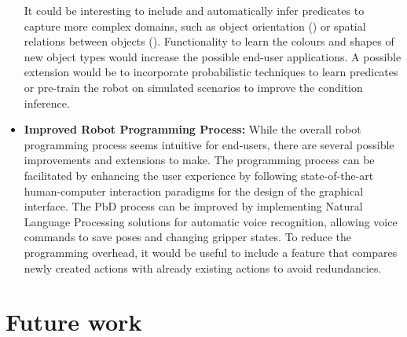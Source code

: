 \begin{itemize}
{	It could be interesting to include and automatically infer predicates to capture more complex domains, such as object orientation (\cite{li2016learning}) or spatial relations between objects (\cite{tremblay2018synthetically}).
	Functionality to learn the colours and shapes of new object types would increase the possible end-user applications.
	A possible extension would be to incorporate probabilistic techniques to learn predicates or pre-train the robot on simulated scenarios to improve the condition inference.
}
\item {
	\textbf{Improved Robot Programming Process:}
	While the overall robot programming process seems intuitive for end-users, there are several possible improvements and extensions to make.
	The programming process can be facilitated by enhancing the user experience by following state-of-the-art human-computer interaction paradigms for the design of the graphical interface.
	The PbD process can be improved by implementing Natural Language Processing solutions for automatic voice recognition, allowing voice commands to save poses and changing gripper states.
	To reduce the programming overhead, it would be useful to include a feature that compares newly created actions with already existing actions to avoid redundancies.
}
\end{itemize}




\section{Future work}
%

